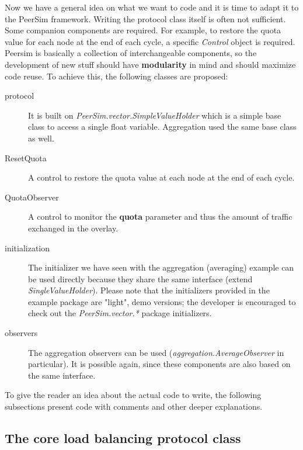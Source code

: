 \documentclass[a4paper,11pt]{article}
\begin{document}
Now we have a general idea on what we want to code and it is time to
adapt it to the PeerSim framework. Writing the protocol class itself
is often not sufficient. Some companion components are required.
For example, to restore the quota value for each node at the end of
each cycle, a specific \emph{Control} object is required. Peersim
is basically a collection of interchangeable components, so the development
of new stuff should have \textbf{modularity} in mind and should maximize
code reuse. To achieve this, the following classes are proposed:

\begin{description}
\item[protocol]  It is built on
  \emph{PeerSim.vector.SimpleValueHolder} which is a simple base class
  to access a single float variable. Aggregation used the same base class
  as well.

\item[ResetQuota] A control to restore the quota value
  at each node at the end of each cycle.

\item[QuotaObserver] A control to monitor the \textbf{quota}
  parameter and thus the amount of traffic exchanged in the overlay. 

\item[initialization]
 The initializer we have seen with the aggregation (averaging) example can
 be used directly because they
 share the same interface (extend \emph{SingleValueHolder}).
Please note that the initializers provided in the example package are
"light", demo versions; the developer is encouraged to check out the
\emph{PeerSim.vector.*} package initializers.

\item[observers] The aggregation observers can be
  used (\emph{aggregation.AverageObserver} in particular). It is possible
  again, since these components are also based on the same interface.
\end{description}

To give the reader an idea about the actual code to write, the following
subsections present code with comments and other deeper explanations.

\subsection{The core load balancing protocol class}
\end{document}
